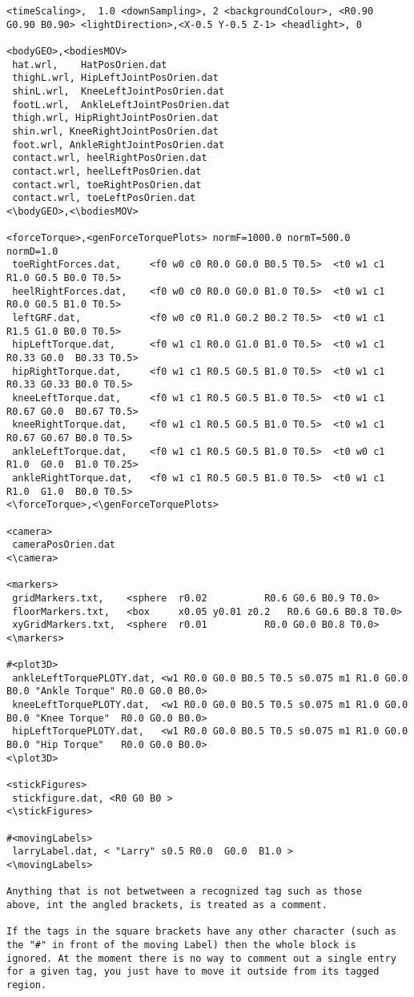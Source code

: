 \begin{verbatim}
<timeScaling>,  1.0 <downSampling>, 2 <backgroundColour>, <R0.90
G0.90 B0.90> <lightDirection>,<X-0.5 Y-0.5 Z-1> <headlight>, 0

<bodyGEO>,<bodiesMOV>
 hat.wrl,    HatPosOrien.dat
 thighL.wrl, HipLeftJointPosOrien.dat
 shinL.wrl,  KneeLeftJointPosOrien.dat
 footL.wrl,  AnkleLeftJointPosOrien.dat
 thigh.wrl, HipRightJointPosOrien.dat
 shin.wrl, KneeRightJointPosOrien.dat
 foot.wrl, AnkleRightJointPosOrien.dat
 contact.wrl, heelRightPosOrien.dat
 contact.wrl, heelLeftPosOrien.dat
 contact.wrl, toeRightPosOrien.dat
 contact.wrl, toeLeftPosOrien.dat
<\bodyGEO>,<\bodiesMOV>

<forceTorque>,<genForceTorquePlots> normF=1000.0 normT=500.0
normD=1.0
 toeRightForces.dat,     <f0 w0 c0 R0.0 G0.0 B0.5 T0.5>  <t0 w1 c1 R1.0 G0.5 B0.0 T0.5>
 heelRightForces.dat,    <f0 w0 c0 R0.0 G0.0 B1.0 T0.5>  <t0 w1 c1 R0.0 G0.5 B1.0 T0.5>
 leftGRF.dat,            <f0 w0 c0 R1.0 G0.2 B0.2 T0.5>  <t0 w1 c1 R1.5 G1.0 B0.0 T0.5>
 hipLeftTorque.dat,      <f0 w1 c1 R0.0 G1.0 B1.0 T0.5>  <t0 w1 c1 R0.33 G0.0  B0.33 T0.5>
 hipRightTorque.dat,     <f0 w1 c1 R0.5 G0.5 B1.0 T0.5>  <t0 w1 c1 R0.33 G0.33 B0.0 T0.5>
 kneeLeftTorque.dat,     <f0 w1 c1 R0.5 G0.5 B1.0 T0.5>  <t0 w1 c1 R0.67 G0.0  B0.67 T0.5>
 kneeRightTorque.dat,    <f0 w1 c1 R0.5 G0.5 B1.0 T0.5>  <t0 w1 c1 R0.67 G0.67 B0.0 T0.5>
 ankleLeftTorque.dat,    <f0 w1 c1 R0.5 G0.5 B1.0 T0.5>  <t0 w0 c1 R1.0  G0.0  B1.0 T0.25>
 ankleRightTorque.dat,   <f0 w1 c1 R0.5 G0.5 B1.0 T0.5>  <t0 w1 c1 R1.0  G1.0  B0.0 T0.5>
<\forceTorque>,<\genForceTorquePlots>

<camera>
 cameraPosOrien.dat
<\camera>

<markers>
 gridMarkers.txt,    <sphere  r0.02          R0.6 G0.6 B0.9 T0.0>
 floorMarkers.txt,   <box     x0.05 y0.01 z0.2   R0.6 G0.6 B0.8 T0.0>
 xyGridMarkers.txt,  <sphere  r0.01          R0.0 G0.0 B0.8 T0.0>
<\markers>

#<plot3D>
 ankleLeftTorquePLOTY.dat, <w1 R0.0 G0.0 B0.5 T0.5 s0.075 m1 R1.0 G0.0 B0.0 "Ankle Torque" R0.0 G0.0 B0.0>
 kneeLeftTorquePLOTY.dat,  <w1 R0.0 G0.0 B0.5 T0.5 s0.075 m1 R1.0 G0.0 B0.0 "Knee Torque"  R0.0 G0.0 B0.0>
 hipLeftTorquePLOTY.dat,   <w1 R0.0 G0.0 B0.5 T0.5 s0.075 m1 R1.0 G0.0 B0.0 "Hip Torque"   R0.0 G0.0 B0.0>
<\plot3D>

<stickFigures>
 stickfigure.dat, <R0 G0 B0 >
<\stickFigures>

#<movingLabels>
 larryLabel.dat, < "Larry" s0.5 R0.0  G0.0  B1.0 >
<\movingLabels>

Anything that is not betwetween a recognized tag such as those
above, int the angled brackets, is treated as a comment.

If the tags in the square brackets have any other character (such as
the "#" in front of the moving Label) then the whole block is
ignored. At the moment there is no way to comment out a single entry
for a given tag, you just have to move it outside from its tagged
region.
\end{verbatim}

